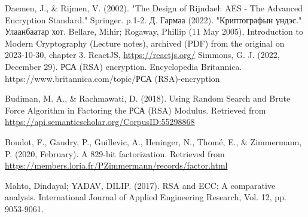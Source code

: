 
\singlespace
{}
\begin{thebibliography}{}
	Daemen, J., \& Rijmen, V. (2002). "The Design of Rijndael: AES - The Advanced Encryption Standard." Springer. p.1-2.
	Д. Гармаа (2022). "Криптографын үндэс." Улаанбаатар хот.
	Bellare, Mihir; Rogaway, Phillip (11 May 2005), Introduction to Modern Cryptography (Lecture notes), archived (PDF) from the original on 2023-10-30, chapter 3.
	ReactJS, \url{https://reactjs.org/}
	Simmons, G. J. (2022, December 29). РСА (RSA) encryption. Encyclopedia Britannica. https://www.britannica.com/topic/РСА (RSA)-encryption

	Budiman, M. A., \& Rachmawati, D. (2018). Using Random Search and Brute Force Algorithm in Factoring the РСА (RSA) Modulus. Retrieved from \url{https://api.semanticscholar.org/CorpusID:55298868}

Boudot, F., Gaudry, P., Guillevic, A., Heninger, N., Thomé, E., \& Zimmermann, P. (2020, February). A 829-bit factorization. Retrieved from \url{https://members.loria.fr/PZimmermann/records/factor.html}

Mahto, Dindayal; YADAV, DILIP. (2017). RSA and ECC: A comparative analysis. International Journal of Applied Engineering Research, Vol. 12, pp. 9053-9061.

\end{thebibliography}